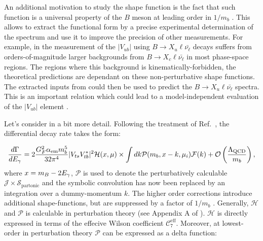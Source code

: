 An additional motivation to study the shape function is the fact that such function is a universal property of the $B$ meson at leading order in $1/m_b$ \cite{Neubert:1993um,Bigi:1993ex}.
This allows to extract the functional form by a precise experimental determination of the \BtoXsgamma spectrum and use it to improve the precision of other measurements.
For example, in the measurement of the $|V_{ub}|$ using $B\rightarrow X_u \ell \bar{\nu_{\ell}}$ decays suffers from orders-of-magnitude larger backgrounds from $B\rightarrow X_c \ell \bar{\nu_{\ell}}$ in most phase-space regions.
The regions where this background is kinematically-forbidden, the theoretical predictions are dependant on these non-perturbative shape functions.
The extracted inputs from \BtoXsgamma could then be used to predict the $B\rightarrow X_u \ell \bar{\nu_{\ell}}$ spectra.
This is an important relation which could lead to a model-independent evaluation of the $|V_{ub}|$ element \cite{Neubert:1993um}.

Let's consider  in a bit more detail.
Following the treatment of Ref.~\cite{Ligeti:2008ac}, the differential decay rate takes the form:

\begin{equation}\label{eq:differential_decay_simba}
    \frac{d\Gamma}{dE_{\gamma}} = 2\frac{G_F^2\alpha_{\mathrm{em}} m_b^5}{32\pi^4}|V_{ts}V_{tb}^*|^2 \mathcal{H}(x, \mu) \times \int dk \mathcal{P}(m_b, x - k, \mu_i) \mathcal{F}(k) + {\cal O}\left(\frac{\Lambda_{\mathrm{QCD}}}{m_b}\right),
\end{equation}
where $x=m_B-2{E_{\gamma}}$, $\mathcal{P}$ is used to denote the perturbatively calculable $\mathcal{J}\times\mathcal{S_{\mathrm{partonic}}}$ and the symbolic convolution has now been replaced by an integration over a dummy-momentum $k$.
The higher order corrections introduce additional shape-functions, but are suppressed by a factor of $1/m_b$ \cite{Neubert:2002yx}.
Generally, $\mathcal{H}$ and $\mathcal{P}$ is calculable in perturbation theory (see Appendix A of \cite{Ligeti:2008ac}).
$\mathcal{H}$ is directly expressed in terms of the effecive Wilson coefficient $\mathcal{C}_7^{\mathrm{eff}}$. 
Moreover, at lowest-order in perturbation theory $\mathcal{P}$ can be expressed as a delta function:

